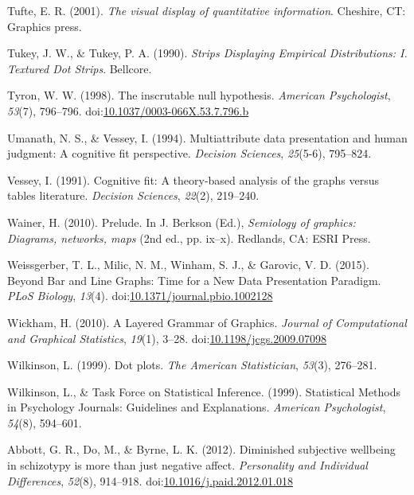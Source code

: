 \documentclass[
  man]{apa6}
\newlength{\cslhangindent}
\newenvironment{cslreferences}%
  {\setlength{\parindent}{0pt}%
  \everypar{\setlength{\hangindent}{\cslhangindent}}\ignorespaces}%
  {\par}
\begin{document}
\begin{cslreferences}
\leavevmode\hypertarget{ref-Tufte2001}{}%
Tufte, E. R. (2001). \emph{The visual display of quantitative information}. Cheshire, CT: Graphics press.

\leavevmode\hypertarget{ref-Tukey1990}{}%
Tukey, J. W., \& Tukey, P. A. (1990). \emph{Strips Displaying Empirical Distributions: I. Textured Dot Strips}. Bellcore.

\leavevmode\hypertarget{ref-Tyron1998}{}%
Tyron, W. W. (1998). The inscrutable null hypothesis. \emph{American Psychologist}, \emph{53}(7), 796--796. doi:\href{https://doi.org/10.1037/0003-066X.53.7.796.b}{10.1037/0003-066X.53.7.796.b}

\leavevmode\hypertarget{ref-umanath1994multiattribute}{}%
Umanath, N. S., \& Vessey, I. (1994). Multiattribute data presentation and human judgment: A cognitive fit perspective. \emph{Decision Sciences}, \emph{25}(5-6), 795--824.

\leavevmode\hypertarget{ref-vessey1991cognitive}{}%
Vessey, I. (1991). Cognitive fit: A theory-based analysis of the graphs versus tables literature. \emph{Decision Sciences}, \emph{22}(2), 219--240.

\leavevmode\hypertarget{ref-Wainer2010}{}%
Wainer, H. (2010). Prelude. In J. Berkson (Ed.), \emph{Semiology of graphics: Diagrams, networks, maps} (2nd ed., pp. ix--x). Redlands, CA: ESRI Press.

\leavevmode\hypertarget{ref-Weissgerber2015}{}%
Weissgerber, T. L., Milic, N. M., Winham, S. J., \& Garovic, V. D. (2015). Beyond Bar and Line Graphs: Time for a New Data Presentation Paradigm. \emph{PLoS Biology}, \emph{13}(4). doi:\href{https://doi.org/10.1371/journal.pbio.1002128}{10.1371/journal.pbio.1002128}

\leavevmode\hypertarget{ref-Wickham2010}{}%
Wickham, H. (2010). A Layered Grammar of Graphics. \emph{Journal of Computational and Graphical Statistics}, \emph{19}(1), 3--28. doi:\href{https://doi.org/10.1198/jcgs.2009.07098}{10.1198/jcgs.2009.07098}

\leavevmode\hypertarget{ref-Wilkinson1999}{}%
Wilkinson, L. (1999). Dot plots. \emph{The American Statistician}, \emph{53}(3), 276--281.

\leavevmode\hypertarget{ref-Wilkinson1999a}{}%
Wilkinson, L., \& Task Force on Statistical Inference. (1999). Statistical Methods in Psychology Journals: Guidelines and Explanations. \emph{American Psychologist}, \emph{54}(8), 594--601.

\leavevmode\hypertarget{ref-Abbott2012}{}%
Abbott, G. R., Do, M., \& Byrne, L. K. (2012). Diminished subjective wellbeing in schizotypy is more than just negative affect. \emph{Personality and Individual Differences}, \emph{52}(8), 914--918. doi:\href{https://doi.org/10.1016/j.paid.2012.01.018}{10.1016/j.paid.2012.01.018}


\end{cslreferences}
\end{document}
